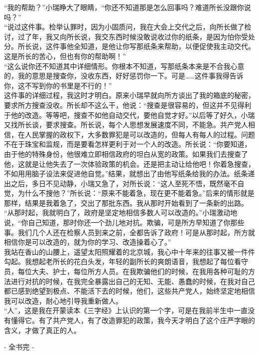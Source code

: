 “我的帮助？”小瑞睁大了眼睛，“你还不知道那是怎么回事吗？难道所长没跟你说吗？”\\

“说过这件事。检举认罪时，因为小固质问，我在大会上交代之后，向所长做了检讨，过了年，我又向所长说，我交东西时候没敢说收过你的纸条，是因为怕你受处分。所长说，这件事他全知道，是他让你写那纸条来帮助，以便促使我主动交代。这是所长的苦心，但也有你的帮助啊！”\\

“这么说你还不知道其中详细情形。你根本不知道，写那纸条本来是不合我心意的，我的意思是搜查你，没收东西，好好惩罚你一下。可是……这件事我得告诉你，这不写到你的书里是不行的！”\\

这件事的详细过程，我这时才明白。原来小瑞早就向所方谈出了我的箱底的秘密，要求所方搜查没收。所长却不这么干，他说：“搜查是很容易的，但这并不见得利于他的改造。等等吧，搜查不如他自动交代，要他自觉才好。”以后等了好久，小瑞又找所长谈，要求搜查。所长说，每个人思想发展速度不同，不能急。共产党人相信，在人民掌握的政权下，大多数罪犯是可以改造的，但每人有每人的过程。问题不在于珠宝和监规，而是要看怎样更利于对一个人的改造。所长说：“你要知道，由于他的特殊身份，他很难立即相信政府的坦白从宽的政策。如果我们去搜查了他，这就是让他失去了一次体验政策的机会。还是把主动让给他吧！你着急搜查，不如用用脑子设法来促进他自觉。”结果，就想出了由他写纸条给我的办法。纸条递出之后，多日不见动静，小瑞又急了，对所长说：“这人至死不悟，既然毫不自觉，为什么不搜他？”所长说：“原来不能着急，现在更不能着急。”后来的情形就是那样，结果是我着急了，交出了那批东西。我从那时开始看到了一条新的出路。\\

“从那时起，我就明白了，政府是坚定地相信多数人可以改造的。”小瑞激动地说，“你自己知道，那时你还一个劲儿地对抗。欺骗，可是所方早知道了你那些事。我们几个人还在检察人员到来之前，全都告诉了政府！可是从那时起，所方就相信你是可以改造的，就为你的学习、改造操着心了。”\\

我站在香山的山腰上，遥望太阳照耀着的北京城，我心中十年来的往事又被一件件勾起。我想起老所长的花白头发，年轻的副所长的爽朗语音，我想起了每位看守员，每位大夫、护士，每位所方人员。在我欺骗他们的时候，在我用各种可耻的方法进行对抗的时候，在我完全暴露出自己的无知、无能、愚蠢的时候，在我对自己都已感到绝望到极点、不能活下去的时候，他们，这些共产党人，始终坚定地相信我可以改造，耐心地引导我重新做人。\\

“人”，这是我在开蒙读本《三字经》上认识的第一个字，可是在我前半生中一直没有懂得它。有了共产党人，有了改造罪犯的政策，我今天才明白了这个庄严字眼的含义，才做了真正的人。\\

\begin{center}
	- 全书完 -
\end{center}
